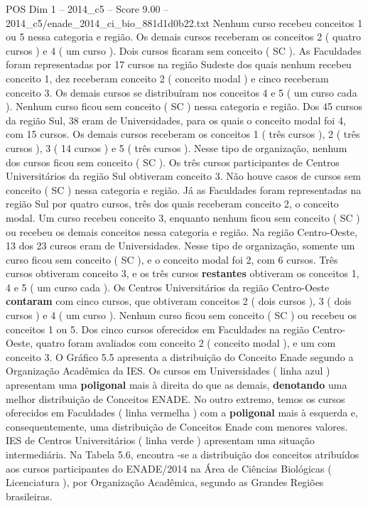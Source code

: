 \begin{textsample}{POS Dim 1 – 2014\_c5 – Score 9.00 – 2014\_c5/enade\_2014\_ci\_bio\_881d1d0b22.txt}
Nenhum curso recebeu conceitos 1 ou 5 nessa categoria e região.
Os demais cursos receberam os conceitos 2 ( quatro cursos ) e 4 ( um curso ).
Dois cursos ficaram sem conceito ( SC ).
As Faculdades foram representadas por 17 cursos na região Sudeste dos quais nenhum recebeu conceito 1, dez receberam conceito 2 ( conceito modal ) e cinco receberam conceito 3.
Os demais cursos se distribuíram nos conceitos 4 e 5 ( um curso cada ).
Nenhum curso ficou sem conceito ( SC ) nessa categoria e região.
Dos 45 cursos da região Sul, 38 eram de Universidades, para os quais o conceito modal foi 4, com 15 cursos.
Os demais cursos receberam os conceitos 1 ( três cursos ), 2 ( três cursos ), 3 ( 14 cursos ) e 5 ( três cursos ).
Nesse tipo de organização, nenhum dos cursos ficou sem conceito ( SC ).
Os três cursos participantes de Centros Universitários da região Sul obtiveram conceito 3.
Não houve casos de cursos sem conceito ( SC ) nessa categoria e região.
Já as Faculdades foram representadas na região Sul por quatro cursos, três dos quais receberam conceito 2, o conceito modal.
Um curso recebeu conceito 3, enquanto nenhum ficou sem conceito ( SC ) ou recebeu os demais conceitos nessa categoria e região.
Na região Centro-Oeste, 13 dos 23 cursos eram de Universidades.
Nesse tipo de organização, somente um curso ficou sem conceito ( SC ), e o conceito modal foi 2, com 6 cursos.
Três cursos obtiveram conceito 3, e os três cursos \textbf{restantes} obtiveram os conceitos 1, 4 e 5 ( um curso cada ).
Os Centros Universitários da região Centro-Oeste \textbf{contaram} com cinco cursos, que obtiveram conceitos 2 ( dois cursos ), 3 ( dois cursos ) e 4 ( um curso ).
Nenhum curso ficou sem conceito ( SC ) ou recebeu os conceitos 1 ou 5.
Dos cinco cursos oferecidos em Faculdades na região Centro-Oeste, quatro foram avaliados com conceito 2 ( conceito modal ), e um com conceito 3.
O Gráfico 5.5 apresenta a distribuição do Conceito Enade segundo a Organização Acadêmica da IES.
Os cursos em Universidades ( linha azul ) apresentam uma \textbf{poligonal} mais à direita do que as demais, \textbf{denotando} uma melhor distribuição de Conceitos ENADE.
No outro extremo, temos os cursos oferecidos em Faculdades ( linha vermelha ) com a \textbf{poligonal} mais à esquerda e, consequentemente, uma distribuição de Conceitos Enade com menores valores.
IES de Centros Universitários ( linha verde ) apresentam uma situação intermediária.
Na Tabela 5.6, encontra -se a distribuição dos conceitos atribuídos aos cursos participantes do ENADE/2014 na Área de Ciências Biológicas ( Licenciatura ), por Organização Acadêmica, segundo as Grandes Regiões brasileiras.

\end{textsample}
